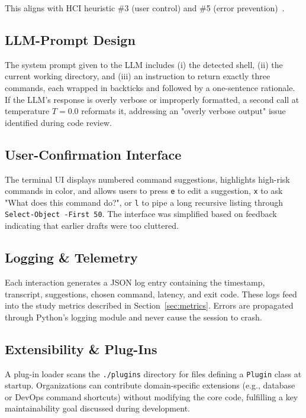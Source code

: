 \documentclass[a4paper,12pt]{article}
\begin{document}
\noindent This aligns with HCI heuristic \#3 (user control) and \#5 (error prevention)~\cite{ref12}. 





\subsection{LLM-Prompt Design}
\label{sec:prompt-design}
\noindent The system prompt given to the LLM includes (i) the detected shell, (ii) the current working directory, and (iii) an instruction to return exactly three commands, each wrapped in backticks and followed by a one-sentence rationale. If the LLM's response is overly verbose or improperly formatted, a second call at temperature $T=0.0$ reformats it, addressing an "overly verbose output" issue identified during code review.

\subsection{User-Confirmation Interface}
\label{sec:confirmation-ui}
\noindent The terminal UI displays numbered command suggestions, highlights high-risk commands in color, and allows users to press \texttt{e} to edit a suggestion, \texttt{x} to ask "What does this command do?", or \texttt{l} to pipe a long recursive listing through \texttt{Select-Object -First 50}. The interface was simplified based on feedback indicating that earlier drafts were too cluttered.

\subsection{Logging \& Telemetry}
\label{sec:logging}
\noindent Each interaction generates a JSON log entry containing the timestamp, transcript, suggestions, chosen command, latency, and exit code. These logs feed into the study metrics described in Section~\ref{sec:metrics}. Errors are propagated through Python's logging module and never cause the session to crash.

\subsection{Extensibility \& Plug-Ins}
\label{sec:plugins}
\noindent A plug-in loader scans the \texttt{./plugins} directory for files defining a \texttt{Plugin} class at startup. Organizations can contribute domain-specific extensions (e.g., database or DevOps command shortcuts) without modifying the core code, fulfilling a key maintainability goal discussed during development.
\end{document}
